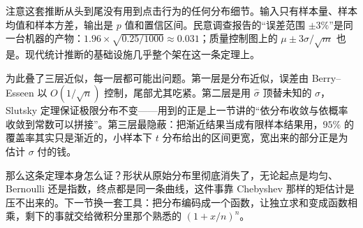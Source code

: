 注意这套推断从头到尾没有用到点击行为的任何分布细节。输入只有样本量、样本均值和样本方差，输出是 \(p\) 值和置信区间。民意调查报告的``误差范围 \(\pm3\%\)''是同一台机器的产物：\(1.96\times\sqrt{0.25/1000}\approx0.031\)；质量控制图上的 \(\mu\pm3\sigma/\sqrt m\) 也是。现代统计推断的基础设施几乎整个架在这一条定理上。

为此叠了三层近似，每一层都可能出问题。第一层是分布近似，误差由 Berry--Esseen 以 \(O(1/\sqrt n)\) 控制，尾部尤其吃紧。第二层是用 \(\hat\sigma\) 顶替未知的 \(\sigma\)，Slutsky 定理保证极限分布不变——用到的正是上一节讲的``依分布收敛与依概率收敛到常数可以拼接''。第三层最隐蔽：把渐近结果当成有限样本结果用，\(95\%\) 的覆盖率其实只是渐近的，小样本下 \(t\) 分布给出的区间更宽，宽出来的部分正是为估计 \(\sigma\) 付的钱。

那么这条定理本身怎么证？形状从原始分布里彻底消失了，无论起点是均匀、Bernoulli 还是指数，终点都是同一条曲线，这件事靠 Chebyshev 那样的矩估计是压不出来的。下一节换一套工具：把分布编码成一个函数，让独立求和变成函数相乘，剩下的事就交给微积分里那个熟悉的 \((1+x/n)^n\)。

